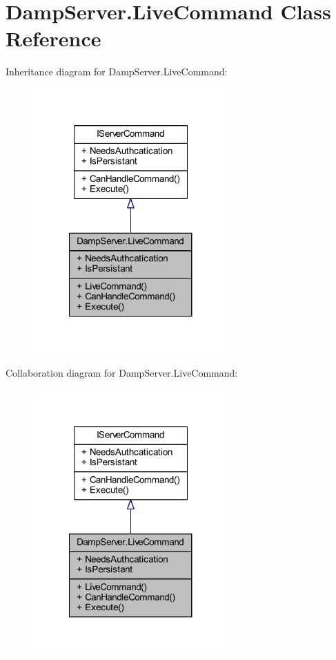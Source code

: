 \hypertarget{class_damp_server_1_1_live_command}{\section{Damp\-Server.\-Live\-Command Class Reference}
\label{class_damp_server_1_1_live_command}
}


Inheritance diagram for Damp\-Server.\-Live\-Command\-:\nopagebreak
\begin{figure}[H]
\begin{center}
\leavevmode
\includegraphics[width=212pt]{class_damp_server_1_1_live_command__inherit__graph}
\end{center}
\end{figure}


Collaboration diagram for Damp\-Server.\-Live\-Command\-:\nopagebreak
\begin{figure}[H]
\begin{center}
\leavevmode
\includegraphics[width=212pt]{class_damp_server_1_1_live_command__coll__graph}
\end{center}
\end{figure}
